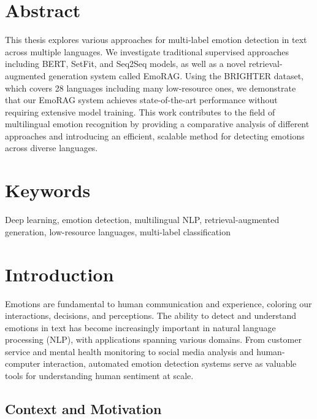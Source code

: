\documentclass[a4paper,12pt]{extarticle}
\begin{document}
\newpage
\setcounter{page}{2}

{
	\hypersetup{linkcolor=black}
	\tableofcontents
}

\newpage

\section*{Abstract}

This thesis explores various approaches for multi-label emotion detection in text across multiple languages. We investigate traditional supervised approaches including BERT, SetFit, and Seq2Seq models, as well as a novel retrieval-augmented generation system called EmoRAG. Using the BRIGHTER dataset, which covers 28 languages including many low-resource ones, we demonstrate that our EmoRAG system achieves state-of-the-art performance without requiring extensive model training. This work contributes to the field of multilingual emotion recognition by providing a comparative analysis of different approaches and introducing an efficient, scalable method for detecting emotions across diverse languages.


\section*{Keywords}
Deep learning, emotion detection, multilingual NLP, retrieval-augmented generation, low-resource languages, multi-label classification

\section{Introduction}

Emotions are fundamental to human communication and experience, coloring our interactions, decisions, and perceptions. The ability to detect and understand emotions in text has become increasingly important in natural language processing (NLP), with applications spanning various domains. From customer service and mental health monitoring to social media analysis and human-computer interaction, automated emotion detection systems serve as valuable tools for understanding human sentiment at scale.

\subsection{Context and Motivation}
\end{document}
